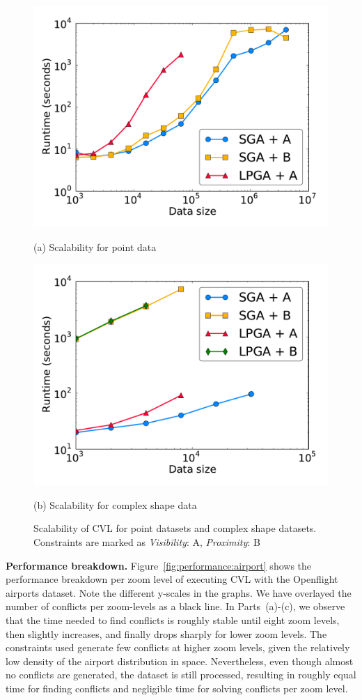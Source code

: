 \documentclass[11pt, oneside]{report}
\newcommand{\minisec}[1]{\noindent\textbf{#1.}}
\begin{document}
{\begin{figure}[tb]
  \begin{minipage}{0.49\linewidth}
    \centerline{\includegraphics[width=0.75\linewidth]{./figs-cvl/scal_pnt_30m_synthetic.pdf}}
    \centerline{(a) Scalability for point data}
  \end{minipage} \hfill
  \begin{minipage}{0.49\linewidth}
    \centerline{\includegraphics[width=0.75\linewidth]{./figs-cvl/scal_lin_30k_uswaterway.pdf}}
    \centerline{(b) Scalability for complex shape data}
  \end{minipage} \hfill
  \caption{Scalability of CVL for point datasets and complex shape datasets. Constraints are marked as \emph{Visibility}: A, \emph{Proximity}: B} \label{fig:cvl:scalability}
\end{figure}

\minisec{Performance breakdown}
Figure~\ref{fig:performance:airport} shows the performance breakdown per zoom level of executing CVL with the Openflight airports dataset. Note the different y-scales in the graphs. We have overlayed the number of conflicts per zoom-levels as a black line. In Parts~(a)-(c), we observe that the time needed to find conflicts is roughly stable until eight zoom levels, then slightly increases, and finally drops sharply for lower zoom levels. The constraints used generate few conflicts at higher zoom levels, given the relatively low density of the airport distribution in space. Nevertheless, even though almost no conflicts are generated, the dataset is still processed, resulting in roughly equal time for finding conflicts and negligible time for solving conflicts per zoom level. 
 
}
\end{document}
